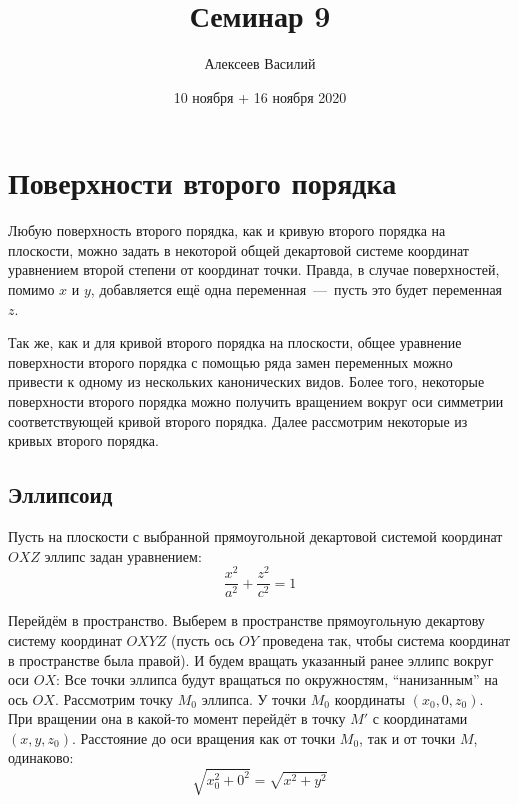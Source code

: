 \documentclass[a4paper,12pt]{article}
\author{Алексеев Василий}
\title{Семинар 9}
\date{10 ноября + 16 ноября 2020}
\begin{document}
  \maketitle
  
  \tableofcontents

  \thispagestyle{empty}
  
  \newpage
  


  \section{Поверхности второго порядка}
  
  Любую поверхность второго порядка, как и кривую второго порядка на плоскости, можно задать в некоторой общей декартовой системе координат уравнением второй степени от координат точки.
  Правда, в случае поверхностей, помимо $x$ и $y$, добавляется ещё одна переменная~---~пусть это будет переменная $z$.
  
  Так же, как и для кривой второго порядка на плоскости, общее уравнение поверхности второго порядка с помощью ряда замен переменных можно привести к одному из нескольких канонических видов.  %
  Более того, некоторые поверхности второго порядка можно получить вращением вокруг оси симметрии соответствующей кривой второго порядка.
  Далее рассмотрим некоторые из кривых второго порядка.
  
  
  \subsection{Эллипсоид}
  
  Пусть на плоскости с выбранной прямоугольной декартовой системой координат $OXZ$ эллипс задан уравнением:
  \[
    \frac{x^2}{a^2} + \frac{z^2}{c^2} = 1
  \]
  
  Перейдём в пространство.
  Выберем в пространстве прямоугольную декартову систему координат $OXYZ$ (пусть ось $OY$ проведена так, чтобы система координат в пространстве была правой).
  И будем вращать указанный ранее эллипс вокруг оси $OX$:
  Все точки эллипса будут вращаться по окружностям, ``нанизанным'' на ось $OX$.
  Рассмотрим точку $M_0$ эллипса.
  У точки $M_0$ координаты $(x_0, 0, z_0)$.
  При вращении она в какой-то момент перейдёт в точку $M'$ с координатами $(x, y, z_0)$.
  Расстояние до оси вращения как от точки $M_0$, так и от точки $M$, одинаково:
  \[
    \sqrt{x_0^2 + 0^2} = \sqrt{x^2 + y^2}
  \]
  
\end{document}
